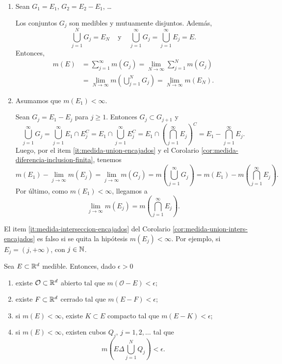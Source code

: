 \begin{demo}{}
\begin{enumerate}
    \item Sean $G_1=E_1$,\; $G_2=E_2-E_1$, \ldots
    
    Los conjuntos $G_j$ son medibles y mutuamente disjuntos. Adem\'as, 
    \[
    \bigcup\limits_{j=1}^{N}G_j =E_N\;\;\;
    \mbox{ y }\;\;\;
    \bigcup\limits_{j=1}^{\infty}G_j 
    =\bigcup\limits_{j=1}^{\infty} E_j=E.
    \]
    Entonces, 
    \[\begin{split}
    m(E)&=\sum\limits_{j=1}^{\infty}m(G_j)=
    \lim\limits_{N \to \infty} \sum\limits_{j=1}^N m(G_j)\\
    &=
    \lim\limits_{N \to \infty} m\left(\bigcup\limits_{j=1}^N G_j\right)=\lim\limits_{N\to \infty}m(E_N).
    \end{split}
    \]
    \item Asumamos que $m(E_1)<\infty$.
    
    Sean $G_j=E_{1}-E_j$ para $j\geq 1$. Entonces 
    $G_j \subset G_{j+1}$ y 
    \[
    \bigcup\limits_{j=1}^{\infty} G_j=
    \bigcup\limits_{j=1}^{\infty} E_{1}\cap E_j^C=
    E_1 \cap \bigcup\limits_{j=1}^{\infty} E_j^C=
    E_1 \cap\left( \bigcap\limits_{j=1}^{\infty} E_j \right)^C=
    E_1 -  \bigcap\limits_{j=1}^{\infty} E_j.
    \]
    Luego, por el item \ref{it:medida-union-encajados} y el Corolario \ref{cor:medida-diferencia-inclusion-finita}, tenemos
    \[
    m(E_1)- \lim\limits_{j \to \infty} m(E_j)=
    \lim\limits_{j \to \infty} m(G_j)=
    m\left(\bigcup\limits_{j=1}^{\infty} G_j\right)=
    m(E_1)-m\left(\bigcap\limits_{j=1}^{\infty} E_j\right).
        \]
     Por \'ultimo, como $m(E_1)<\infty$, llegamos a
     \[
     \lim\limits_{j \to \infty} m(E_j)=m\left(\bigcap\limits_{j=1}^{\infty} E_j\right).
     \]
\end{enumerate}
\end{demo}

\begin{observacion}{}
El item \ref{it:medida-interseccion-encajados} del Corolario \ref{cor:medida-union-inters-encajados} es  falso si se quita la hip\'otesis $m(E_j)<\infty$. 
Por ejemplo, si $E_j=(j, +\infty)$, con $j\in \mathbb{N}$.
\end{observacion}

\begin{teorema}{}
Sea $E\subset \mathbb{R}^d$ medible. Entonces, dado $\epsilon>0$ 
\begin{enumerate}
    \item existe $\mathcal{O}\subset \mathbb{R}^d$ abierto tal que $m(\mathcal{O}-E)<\epsilon$;
    \item existe $F\subset \mathbb{R}^d$ cerrado tal que $m(E-F)<\epsilon$;
    \item si $m(E)<\infty$, existe $K \subset E$ compacto tal que 
    $m(E-K)<\epsilon$;
    \item si $m(E)<\infty$, existen cubos $Q_j$, $j=1,2,\dots$ tal que 
    \[
    m\left(E\Delta \bigcup\limits_{j=1}^N Q_j\right)<\epsilon.
    \]
\end{enumerate}
\end{teorema}

